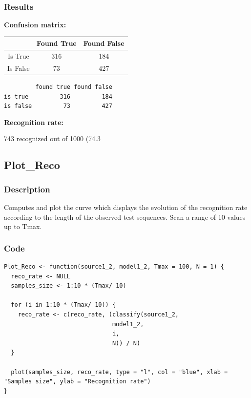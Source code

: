 \documentclass[a4paper]{article}
\begin{document}
\subsubsection{Results}

\textbf{Confusion matrix:}

\hspace{20mm}

\begin{tabular}{ c | c | c }
  & Found True & Found False \\
  \hline
  Is True & 316 & 184 \\
  \hline
  Is False & 73 & 427 \\
\end{tabular}

\hspace{20mm}

\begin{lstlisting}
         found true found false
is true         316         184
is false         73         427
\end{lstlisting}

\textbf{Recognition rate:}

\hspace{10mm}

743 recognized out of 1000 (74.3%

\hspace{10mm}

\subsection{Plot\_Reco}

\subsubsection{Description}
Computes and plot the curve which displays the evolution of the recognition rate according to the length of the observed test sequences. Scan a range of 10 values up to Tmax.
\subsubsection{Code}

\begin{lstlisting}
Plot_Reco <- function(source1_2, model1_2, Tmax = 100, N = 1) {
  reco_rate <- NULL
  samples_size <- 1:10 * (Tmax/ 10)
  
  for (i in 1:10 * (Tmax/ 10)) {
    reco_rate <- c(reco_rate, (classify(source1_2,
                               model1_2,
                               i,
                               N)) / N)
  }
  
  plot(samples_size, reco_rate, type = "l", col = "blue", xlab = "Samples size", ylab = "Recognition rate")
}
\end{lstlisting}
\end{document}
